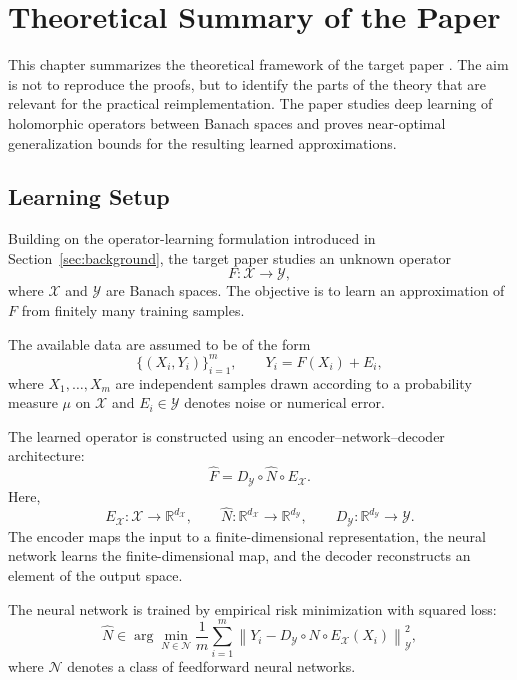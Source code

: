 \cleardoubleoddpage%
\chapter{Theoretical Summary of the Paper}
\label{sec:theoreticalSummary}
This chapter summarizes the theoretical framework of the target paper
\cite{adcock2024holomorphic}. The aim is not to reproduce the proofs, but to identify the parts of the theory that are relevant for the practical
reimplementation. The paper studies deep learning of holomorphic operators
between Banach spaces and proves near-optimal generalization bounds for the resulting learned approximations.

\section{Learning Setup}

Building on the operator-learning formulation introduced in Section~\ref{sec:background}, the target paper studies an unknown operator
\[
    F : \mathcal{X} \to \mathcal{Y},
\]
where $\mathcal{X}$ and $\mathcal{Y}$ are Banach spaces. The objective is to learn an approximation of $F$ from finitely many training samples.

The available data are assumed to be of the form
\[
    \{(X_i,Y_i)\}_{i=1}^{m},
    \qquad
    Y_i = F(X_i) + E_i,
\]
where $X_1,\ldots,X_m$ are independent samples drawn according to a probability measure $\mu$ on $\mathcal{X}$ and $E_i \in \mathcal{Y}$ denotes noise or numerical error.

The learned operator is constructed using an encoder--network--decoder
architecture:
\[
    \widehat{F}
    =
    D_{\mathcal{Y}} \circ \widehat{N} \circ E_{\mathcal{X}}.
\]
Here,
\[
    E_{\mathcal{X}} : \mathcal{X} \to \mathbb{R}^{d_{\mathcal{X}}},
    \qquad
    \widehat{N} : \mathbb{R}^{d_{\mathcal{X}}}
    \to \mathbb{R}^{d_{\mathcal{Y}}},
    \qquad
    D_{\mathcal{Y}} : \mathbb{R}^{d_{\mathcal{Y}}} \to \mathcal{Y}.
\]
The encoder maps the input to a finite-dimensional representation, the neural network learns the finite-dimensional map, and the decoder reconstructs an element of the output space.

The neural network is trained by empirical risk minimization with squared loss:
\[
    \widehat{N}
    \in
    \arg\min_{N \in \mathcal{N}}
    \frac{1}{m}
    \sum_{i=1}^{m}
    \left\|
        Y_i
        -
        D_{\mathcal{Y}} \circ N \circ E_{\mathcal{X}}(X_i)
    \right\|_{\mathcal{Y}}^2,
\]
where $\mathcal{N}$ denotes a class of feedforward neural networks.

